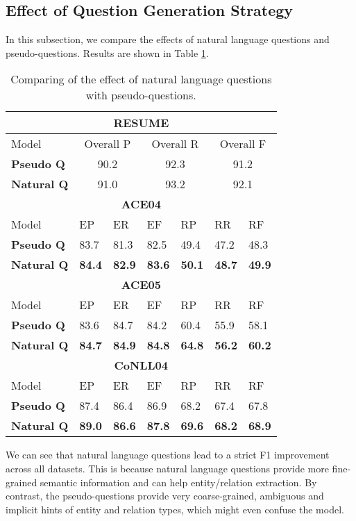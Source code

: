 \documentclass[11pt,a4paper]{article}
\begin{document}
\subsection{Effect of Question Generation Strategy}
In this subsection, we compare the effects of natural language questions and pseudo-questions. 
Results are shown in Table \ref{NLQ}. 
\begin{table}[!ht]
\center
\small
\begin{tabular}{|lllllll|}\hline
\multicolumn{7}{|c|}{{\bf RESUME}}\\\hline
Model & \multicolumn{2}{|c|}{Overall P} & \multicolumn{2}{|c|}{Overall R} & \multicolumn{2}{|c|}{Overall F} \\\hline
{\bf Pseudo Q} &\multicolumn{2}{|c|}{90.2}&\multicolumn{2}{|c|}{92.3}&\multicolumn{2}{|c|}{91.2}\\
{\bf Natural Q} &\multicolumn{2}{|c|}{ 91.0}&\multicolumn{2}{|c|}{93.2}&\multicolumn{2}{|c|}{92.1} \\\hline\hline
\multicolumn{7}{|c|}{{\bf ACE04}}\\\hline
Model & EP & ER & EF & RP & RR & RF  \\\hline
{\bf Pseudo Q} &83.7 & 81.3 & 82.5 & 49.4 & 47.2 &48.3 \\
{\bf Natural Q} & {\bf 84.4} & {\bf 82.9} & {\bf 83.6}& {\bf 50.1} & {\bf 48.7} &{\bf 49.9}\\\hline\hline
\multicolumn{7}{|c|}{{\bf ACE05}}\\\hline
Model & EP &  ER &  EF & RP &  RR &  RF \\\hline
{\bf Pseudo Q} & 83.6 & 84.7 &84.2& 60.4 & 55.9 &58.1\\
{\bf Natural Q} & {\bf 84.7} & {\bf 84.9} & {\bf 84.8} & {\bf 64.8} & {\bf 56.2} &{\bf 60.2} \\\hline\hline
\multicolumn{7}{|c|}{{\bf CoNLL04}}\\\hline
Model & EP & ER & EF & RP & RR & RF \\\hline
{\bf Pseudo Q} & 87.4 & 86.4 & 86.9 & 68.2 & 67.4 &67.8 \\\hline
{\bf Natural Q}& {\bf 89.0} & {\bf 86.6} & {\bf 87.8} & {\bf 69.6} & {\bf 68.2} & {\bf 68.9} \\\hline
\end{tabular}
\caption{Comparing of the effect of natural language questions with   pseudo-questions.}
\label{NLQ}
\end{table}

We can see that natural language questions lead to a strict F1 improvement across all  datasets. 
This is because natural language questions provide more fine-grained semantic information and can help entity/relation extraction. By contrast, the pseudo-questions provide very coarse-grained,  ambiguous  and implicit hints of entity and relation types, which might even confuse the model. 
\end{document}
